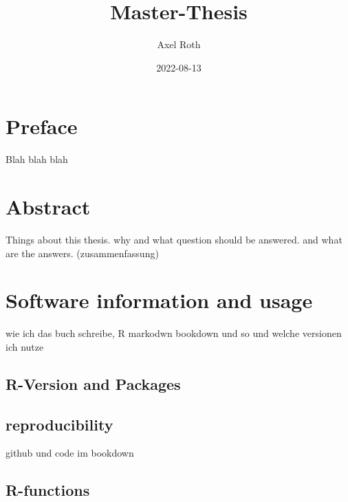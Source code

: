 \documentclass[
  oneside]{book}
\title{Master-Thesis}
\author{Axel Roth}
\date{2022-08-13}
\begin{document}
\maketitle

{
\setcounter{tocdepth}{1}
\tableofcontents
}
\hypertarget{preface}{%
\chapter*{Preface}\label{preface}}

\renewcommand{\chaptermark}[1]{\markboth{\uppercase{#1}}{\uppercase{#1}}}

Blah blah blah

\renewcommand{\chaptermark}[1]{\markboth{\uppercase{\thechapter. \ #1}}{}}

\hypertarget{abstract}{%
\chapter{Abstract}\label{abstract}}

Things about this thesis. why and what question should be answered. and what are the answers. (zusammenfassung)

\hypertarget{software-information-and-usage}{%
\chapter{Software information and usage}\label{software-information-and-usage}}

wie ich das buch schreibe, R markodwn bookdown und so und welche versionen ich nutze

\hypertarget{r-version-and-packages}{%
\section{R-Version and Packages}\label{r-version-and-packages}}

\hypertarget{reproducibility}{%
\section{reproducibility}\label{reproducibility}}

github und code im bookdown

\hypertarget{r-functions}{%
\section{R-functions}\label{r-functions}}
\end{document}
